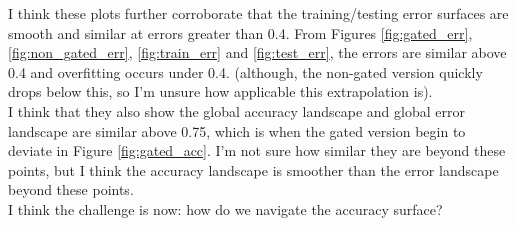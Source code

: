 \documentclass[prl,superscriptaddress,showpacs,twocolumn]{revtex4-1}
\begin{document}
I think these plots further corroborate that the training/testing error surfaces are smooth and similar at errors greater than 0.4. From Figures \ref{fig:gated_err}, \ref{fig:non_gated_err}, \ref{fig:train_err} and \ref{fig:test_err}, the errors are similar above 0.4 and overfitting occurs under 0.4. (although, the non-gated version quickly drops below this, so I'm unsure how applicable this extrapolation is). \\
\indent
I think that they also show the global accuracy landscape and global error landscape are similar above 0.75, which is when the gated version begin to deviate in Figure \ref{fig:gated_acc}. I'm not sure how similar they are beyond these points, but I think the accuracy landscape is smoother than the error landscape beyond these points. \\
\indent
I think the challenge is now: how do we navigate the accuracy surface? 
\end{document}
